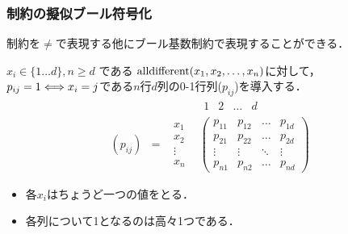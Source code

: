 \begin{frame}
    \frametitle{{\alldiff}制約の擬似ブール符号化}
    {\alldiff}制約を$\neq$で表現する他にブール基数制約で表現することができる．
    \begin{exampleblock}{}
        $x_i \in \{ 1 \dots d \}, n \geq d$ である $\textrm{alldifferent}(x_1,x_2,\ldots,x_n)$に対して，$p_{ij}=1 \Longleftrightarrow x_i=j$である$n$行$d$列の0-1行列($p_{ij}$)を導入する．
        \begin{displaymath}
            \begin{array}{cccc}
             & & &
             \begin{array}{cccc}
                 1&2&\dots&d
             \end{array}\\
                (p_{ij})&=&
                \begin{array}{c}x_1\\ x_2\\ \vdots\\ x_n \end{array}&
                \left(
                    \begin{array}{cccc}
                        p_{11}&p_{12}&\dots&p_{1d}\\
                        p_{21}&p_{22}&\dots&p_{2d}\\
                        \vdots&\vdots&\ddots&\vdots\\
                        p_{n1}&p_{n2}&\dots&p_{nd}
                \end{array}\right)
            \end{array}
        \end{displaymath}
        \begin{itemize}
            \item 各$x_i$はちょうど一つの値をとる．
            \item 各列について1となるのは高々1つである．
        \end{itemize}
    \end{exampleblock}
\end{frame}

\backupend

